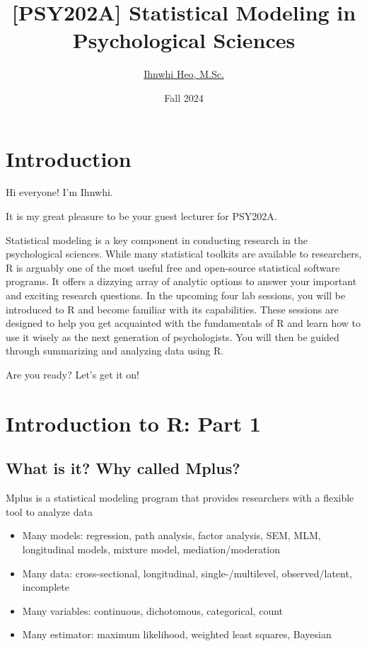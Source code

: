 \documentclass[
]{book}
\title{{[}PSY202A{]} Statistical Modeling in Psychological Sciences}
\author{\href{https://ihnwhiheo.github.io/}{Ihnwhi Heo, M.Sc.}}
\date{Fall 2024}
\begin{document}
\maketitle

{
\setcounter{tocdepth}{1}
\tableofcontents
}
\chapter{Introduction}\label{introduction}

Hi everyone! I'm Ihnwhi.

It is my great pleasure to be your guest lecturer for PSY202A.

Statistical modeling is a key component in conducting research in the psychological sciences. While many statistical toolkits are available to researchers, R is arguably one of the most useful free and open-source statistical software programs. It offers a dizzying array of analytic options to answer your important and exciting research questions. In the upcoming four lab sessions, you will be introduced to R and become familiar with its capabilities. These sessions are designed to help you get acquainted with the fundamentals of R and learn how to use it wisely as the next generation of psychologists. You will then be guided through summarizing and analyzing data using R.

Are you ready? Let's get it on!

\chapter{Introduction to R: Part 1}\label{introduction-to-r-part-1}

\section{What is it? Why called Mplus?}\label{what-is-it-why-called-mplus}

Mplus is a statistical modeling program that provides researchers with a flexible tool to analyze data

\begin{itemize}
\item
  Many models: regression, path analysis, factor analysis, SEM, MLM, longitudinal models, mixture model, mediation/moderation
\item
  Many data: cross-sectional, longitudinal, single-/multilevel, observed/latent, incomplete
\item
  Many variables: continuous, dichotomous, categorical, count
\item
  Many estimator: maximum likelihood, weighted least squares, Bayesian
\end{itemize}
\end{document}
